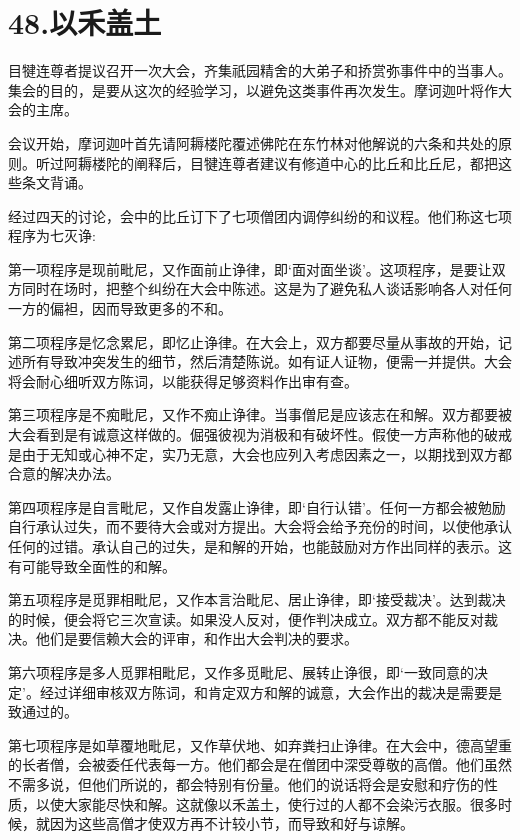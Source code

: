 \documentclass[12pt,twoside,openany]{book}
\begin{document}

\chapter{48.以禾盖土}\label{ch48}

目犍连尊者提议召开一次大会，齐集祇园精舍的大弟子和挢赏弥事件中的当事人。集会的目的，是要从这次的经验学习，以避免这类事件再次发生。摩诃迦叶将作大会的主席。

会议开始，摩诃迦叶首先请阿耨楼陀覆述佛陀在东竹林对他解说的六条和共处的原则。听过阿耨楼陀的阐释后，目犍连尊者建议有修道中心的比丘和比丘尼，都把这些条文背诵。

经过四天的讨论，会中的比丘订下了七项僧团内调停纠纷的和议程。他们称这七项程序为七灭诤:

第一项程序是现前毗尼，又作面前止诤律，即‘面对面坐谈’。这项程序，是要让双方同时在场时，把整个纠纷在大会中陈述。这是为了避免私人谈话影响各人对任何一方的偏袒，因而导致更多的不和。

第二项程序是忆念累尼，即忆止诤律。在大会上，双方都要尽量从事故的开始，记述所有导致冲突发生的细节，然后清楚陈说。如有证人证物，便需一并提供。大会将会耐心细听双方陈词，以能获得足够资料作出审有查。

第三项程序是不痴毗尼，又作不痴止诤律。当事僧尼是应该志在和解。双方都要被大会看到是有诚意这样做的。倔强彼视为消极和有破坏性。假使一方声称他的破戒是由于无知或心神不定，实乃无意，大会也应列入考虑因素之一，以期找到双方都合意的解决办法。

第四项程序是自言毗尼，又作自发露止诤律，即‘自行认错’。任何一方都会被勉励自行承认过失，而不要待大会或对方提出。大会将会给予充份的时间，以使他承认任何的过错。承认自己的过失，是和解的开始，也能鼓励对方作出同样的表示。这有可能导致全面性的和解。

第五项程序是觅罪相毗尼，又作本言治毗尼、居止诤律，即‘接受裁决’。达到裁决的时候，便会将它三次宣读。如果没人反对，便作判决成立。双方都不能反对裁决。他们是要信赖大会的评审，和作出大会判决的要求。

第六项程序是多人觅罪相毗尼，又作多觅毗尼、展转止诤很，即‘一致同意的决定’。经过详细审核双方陈词，和肯定双方和解的诚意，大会作出的裁决是需要是致通过的。

第七项程序是如草覆地毗尼，又作草伏地、如弃粪扫止诤律。在大会中，德高望重的长者僧，会被委任代表每一方。他们都会是在僧团中深受尊敬的高僧。他们虽然不需多说，但他们所说的，都会特别有份量。他们的说话将会是安慰和疗伤的性质，以使大家能尽快和解。这就像以禾盖土，使行过的人都不会染污衣服。很多时候，就因为这些高僧才使双方再不计较小节，而导致和好与谅解。
\end{document}
